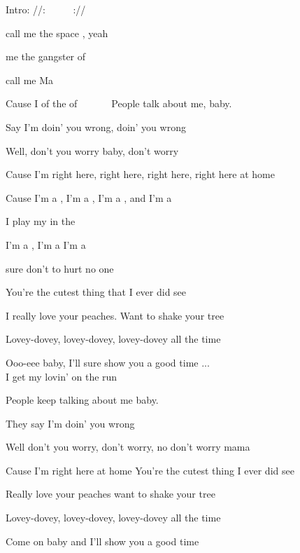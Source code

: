 
Intro: //: ~  ~  ~  ://

\zs
{}  call me the space , yeah~ ~ 

  me the gangster of  ~~~~ ~ 

  call me Ma ~~~~

Cause I  of the  of  ~~~~ ~ 
\ks
\zs
People talk about me, baby. 

Say I'm doin' you wrong, doin' you wrong

Well, don't you worry baby, don't worry

Cause I'm right here, right here, right here, right here at home
\ks
\zr

Cause I'm a , I'm a , I'm a , and I'm a  ~~~~ 

I play my  in the  ~~~~ 
\bigskip

I'm a , I'm a  I'm a  

 sure don't  to hurt no   {one} ~~~ 
\kr

\zs
You're the cutest thing that I ever did see

I really love your peaches. Want to shake your tree

Lovey-dovey, lovey-dovey, lovey-dovey all the time

Ooo-eee baby, I'll sure show you a good time
\ks
\zr
...\\
I get my lovin' on the run
\kr

\zr\kr

\zs
People keep talking about me baby.

They say I'm doin' you wrong

Well don't you worry, don't worry, no don't worry mama

Cause I'm right here at home
\ks
\zs
You're the cutest thing I ever did see

Really love your peaches want to shake your tree

Lovey-dovey, lovey-dovey, lovey-dovey all the time

Come on baby and I'll show you a good time
\ks
\kp